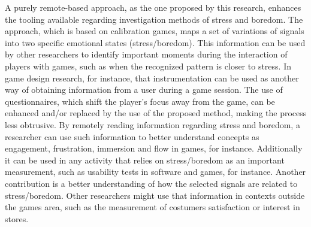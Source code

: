 A purely remote-based approach, as the one proposed by this research, enhances the tooling available regarding investigation methods of stress and boredom. The approach, which is based on calibration games, maps a set of variations of signals into two specific emotional states (stress/boredom). This information can be used by other researchers to identify important moments during the interaction of players with games, such as when the recognized pattern is closer to stress. In game design research, for instance, that instrumentation can be used as another way of obtaining information from a user during a game session. The use of questionnaires, which shift the player's focus away from the game, can be enhanced and/or replaced by the use of the proposed method, making the process less obtrusive. By remotely reading information regarding stress and boredom, a researcher can use such information to better understand concepts as engagement, frustration, immersion and flow in games, for instance. Additionally it can be used in any activity that relies on stress/boredom as an important measurement, such as usability tests in software and games, for instance. Another contribution is a better understanding of how the selected signals are related to stress/boredom. Other researchers might use that information in contexts outside the games area, such as the measurement of costumers satisfaction or interest in stores.


